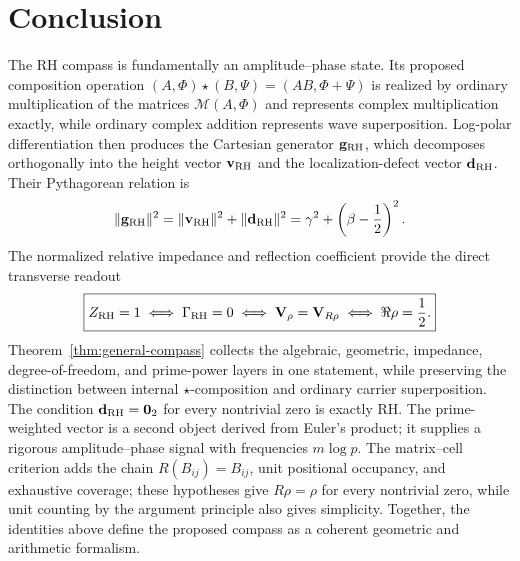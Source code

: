 \documentclass[11pt]{article}
\newcommand{\vzero}{\mathbf 0}
\begin{document}
\section{Conclusion}
The RH compass is fundamentally an amplitude--phase state.  Its proposed composition operation
$(A,\Phi)\star(B,\Psi)=(AB,\Phi+\Psi)$ is realized by ordinary multiplication of the matrices
$\mathcal M(A,\Phi)$ and represents complex multiplication exactly, while
ordinary complex addition represents wave superposition.  Log-polar differentiation then
produces the Cartesian generator $\mathbf g_{\rm RH}$, which decomposes orthogonally into the
height vector $\mathbf v_{\rm RH}$ and the localization-defect vector
$\mathbf d_{\rm RH}$.  Their Pythagorean relation is
\begin{equation}
 \|\mathbf g_{\rm RH}\|^2
 =\|\mathbf v_{\rm RH}\|^2+\|\mathbf d_{\rm RH}\|^2
 =\gamma^2+\left(\beta-\frac12\right)^2.
\end{equation}
The normalized relative impedance and reflection coefficient provide the direct transverse
readout
\begin{equation}
 \boxed{
 Z_{\rm RH}=1
 \iff \Gamma_{\rm RH}=0
 \iff \mathbf V_\rho=\mathbf V_{R\rho}
 \iff \Re\rho=\frac12.}
\end{equation}
Theorem~\ref{thm:general-compass} collects the algebraic, geometric, impedance, degree-of-freedom,
and prime-power layers in one statement, while preserving the distinction between internal
$\star$-composition and ordinary carrier superposition.
The condition $\mathbf d_{\rm RH}=\vzero_2$ for every nontrivial zero is exactly RH.  The
prime-weighted vector is a second object derived from Euler's product; it supplies a rigorous
amplitude--phase signal with frequencies $m\log p$.  The matrix--cell criterion adds the chain
$R(B_{ij})=B_{ij}$, unit positional occupancy, and exhaustive coverage; these hypotheses give
$R\rho=\rho$ for every nontrivial zero, while unit counting by the argument principle also gives
simplicity.  Together, the identities above define the proposed compass as a coherent geometric
and arithmetic formalism.
\end{document}
